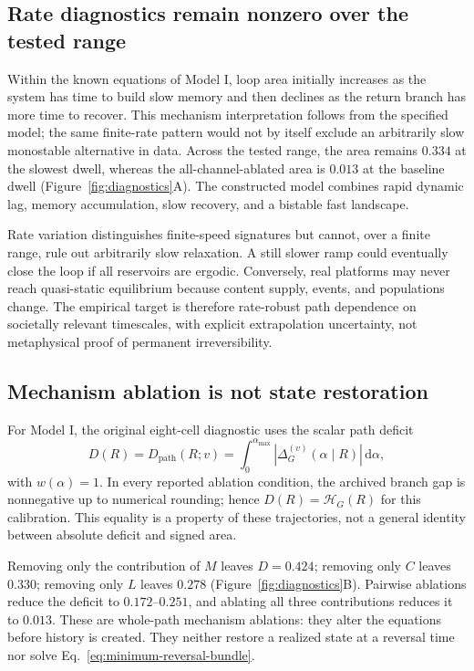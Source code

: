 \documentclass[10pt,a4paper]{article}
\newcommand{\alphamax}{\alpha_{\max}}
\newcommand{\dd}{\mathrm{d}}
\begin{document}
\subsection{Rate diagnostics remain nonzero over the tested range}

Within the known equations of Model I, loop area initially increases as the system has time to build slow memory and then declines as the return branch has more time to recover. This mechanism interpretation follows from the specified model; the same finite-rate pattern would not by itself exclude an arbitrarily slow monostable alternative in data. Across the tested range, the area remains $0.334$ at the slowest dwell, whereas the all-channel-ablated area is $0.013$ at the baseline dwell (Figure~\ref{fig:diagnostics}A). The constructed model combines rapid dynamic lag, memory accumulation, slow recovery, and a bistable fast landscape.

Rate variation distinguishes finite-speed signatures but cannot, over a finite range, rule out arbitrarily slow relaxation. A still slower ramp could eventually close the loop if all reservoirs are ergodic. Conversely, real platforms may never reach quasi-static equilibrium because content supply, events, and populations change. The empirical target is therefore rate-robust path dependence on societally relevant timescales, with explicit extrapolation uncertainty, not metaphysical proof of permanent irreversibility.

\subsection{Mechanism ablation is not state restoration}

For Model I, the original eight-cell diagnostic uses the scalar path deficit
\begin{equation}
D(R)=D_{\mathrm{path}}(R;v)
=\int_0^{\alphamax}
\left|\Delta_G^{(v)}(\alpha\mid R)\right|\,\dd\alpha,
\end{equation}
with $w(\alpha)=1$. In every reported ablation condition, the archived branch gap is nonnegative up to numerical rounding; hence $D(R)=\mathcal H_G(R)$ for this calibration. This equality is a property of these trajectories, not a general identity between absolute deficit and signed area.

Removing only the contribution of $M$ leaves $D=0.424$; removing only $C$ leaves $0.330$; removing only $L$ leaves $0.278$ (Figure~\ref{fig:diagnostics}B). Pairwise ablations reduce the deficit to $0.172$--$0.251$, and ablating all three contributions reduces it to $0.013$. These are whole-path mechanism ablations: they alter the equations before history is created. They neither restore a realized state at a reversal time nor solve Eq.~\eqref{eq:minimum-reversal-bundle}.
\end{document}
